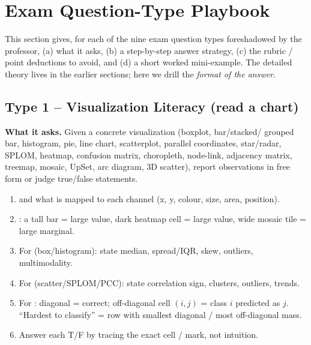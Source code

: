 \section{Exam Question-Type Playbook}
\label{sec:playbook}

This section gives, for each of the nine exam question types foreshadowed by
the professor, (a) what it asks, (b) a step-by-step answer strategy, (c) the
rubric / point deductions to avoid, and (d) a short worked mini-example.
The detailed theory lives in the earlier sections; here we drill the
\emph{format of the answer}.

\subsection{Type 1 -- Visualization Literacy (read a chart)}

\textbf{What it asks.} Given a concrete visualization (boxplot, bar/stacked/
grouped bar, histogram, pie, line chart, scatterplot, parallel coordinates,
star/radar, SPLOM, heatmap, confusion matrix, choropleth, node-link, adjacency
matrix, treemap, mosaic, UpSet, arc diagram, 3D scatter), report observations
in free form or judge true/false statements.

\begin{exambox}
\begin{enumerate}[leftmargin=1.4em]
  \item {} and what is mapped to each channel
        (x, y, colour, size, area, position).
  \item {}: a tall bar = large value,
        dark heatmap cell = large value, wide mosaic tile = large marginal.
  \item For  (box/histogram): state median, spread/IQR,
        skew, outliers, multimodality.
  \item For  (scatter/SPLOM/PCC): state correlation sign,
        clusters, outliers, trends.
  \item For : diagonal = correct; off-diagonal cell
        $(i,j)$ = class $i$ predicted as $j$. ``Hardest to classify'' = row
        with smallest diagonal / most off-diagonal mass.
  \item Answer each T/F by tracing the exact cell / mark, not intuition.
\end{enumerate}
\end{exambox}

